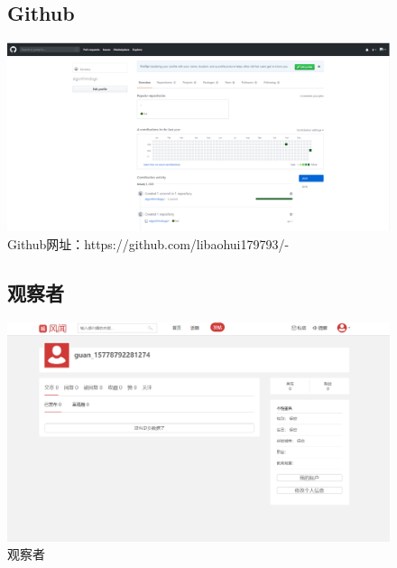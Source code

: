 \documentclass{article}
\begin{document}
\begin{itemize}

\begin{figure}[htb!]
\item\subsection{Github}
\centering
\includegraphics[scale=0.2]{Github}
\caption{Github网址：https://github.com/libaohui179793/-}
\label{fig:Github}
\end{figure}

\begin{figure}[htb!]
\item\subsection{观察者}
\centering
\includegraphics[scale=0.3]{guanchazhe}
\caption{观察者}
\label{fig:guanchazhe}
\end{figure}


\end{itemize}
\end{document}
